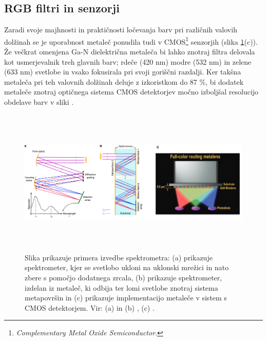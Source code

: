 \documentclass[12pt ]{article}
\begin{document}
  \subsection{RGB filtri in senzorji}
 Zaradi svoje majhnosti in praktičnosti ločevanja barv pri različnih valovih dolžinah se je uporabnost metaleč ponudila tudi v CMOS\footnote{\textit{Complementary Metal Oxide Semiconductor}.} senzorjih (slika  \ref{Spekter}(c)). Že večkrat omenjena Ga-N dielektrična metaleča bi lahko znotraj filtra delovala kot usmerjevalnik treh glavnih barv; rdeče (420 nm) modre (532 nm) in zelene (633 nm) svetlobe in vsako fokusirala pri svoji goriščni razdalji. Ker takšna metaleča pri teh valovnih dolžinah deluje z izkoristkom do 87 \%, bi dodatek metaleče znotraj optičnega sistema CMOS detektorjev močno izboljšal resolucijo obdelave barv v sliki \cite{Metaleče_opis}.
 
  \begin{figure}[H]
     \centering
     \includegraphics[width=15cm, height=7cm]{Slike/Spektrometer 2.png}
     \caption{Slika prikazuje primera izvedbe spektrometra: (a) prikazuje spektrometer, kjer se svetlobo ukloni na uklonski mrežici in nato zbere s pomočjo dodatnega zrcala, (b) prikazuje spektrometer, izdelan iz metaleč, ki odbija ter lomi svetlobe znotraj sistema metapovršin in (c) prikazuje implementacijo metaleče v sistem s CMOS detektorjem. Vir: (a) in (b) \cite{Spektroskop}, (c) \cite{Metaleče_opis}. }
     \label{Spekter}
 \end{figure}
 
\end{document}
